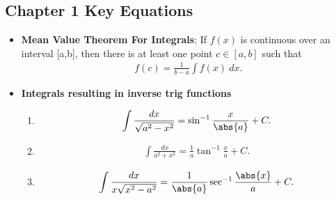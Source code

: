 \documentclass{report}
\begin{document}
    \subsection{Chapter 1 Key Equations}
    \bigbreak \noindent 
    \begin{itemize}
        \item \textbf{Mean Value Theorem For Integrals}: If  $f(x)$ is continuous over an interval  [a,b], then there is at least one point  $c\in[a,b]$ such that 
            \begin{align*}
                f(c) = \frac{1}{b-a}\int f(x)\ dx
            .\end{align*}
        \item \textbf{Integrals resulting in inverse trig functions}
                \begin{enumerate}
        \item \begin{align*}
                \int \frac{dx}{\sqrt{a^{2}-x^{2}}} = \sin^{-1}{\frac{x}{\abs{a}}} + C
        .\end{align*}
    \item \begin{align*}
        \int \frac{dx}{a^{2}+x^{2}} = \frac{1}{a}\tan^{-1}{\frac{x}{a}} + C
    .\end{align*}
    \item \begin{align*}
            \int \frac{dx}{x\sqrt{x^{2}-a^{2}}} = \frac{1}{\abs{a}}\sec^{-1}{\frac{\abs{x}}{a}} + C
    .\end{align*}
    \end{enumerate}
    \end{itemize}

    \pagebreak \bigbreak \noindent 
\end{document}
